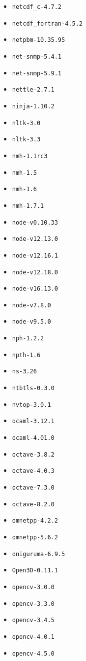 \begin{multicols}{3}
\begin{itemize}
\item \verb|netcdf_c-4.7.2|
\item \verb|netcdf_fortran-4.5.2|
\item \verb|netpbm-10.35.95|
\item \verb|net-snmp-5.4.1|
\item \verb|net-snmp-5.9.1|
\item \verb|nettle-2.7.1|
\item \verb|ninja-1.10.2|
\item \verb|nltk-3.0|
\item \verb|nltk-3.3|
\item \verb|nmh-1.1rc3|
\item \verb|nmh-1.5|
\item \verb|nmh-1.6|
\item \verb|nmh-1.7.1|
\item \verb|node-v0.10.33|
\item \verb|node-v12.13.0|
\item \verb|node-v12.16.1|
\item \verb|node-v12.18.0|
\item \verb|node-v16.13.0|
\item \verb|node-v7.8.0|
\item \verb|node-v9.5.0|
\item \verb|nph-1.2.2|
\item \verb|npth-1.6|
\item \verb|ns-3.26|
\item \verb|ntbtls-0.3.0|
\item \verb|nvtop-3.0.1|
\item \verb|ocaml-3.12.1|
\item \verb|ocaml-4.01.0|
\item \verb|octave-3.8.2|
\item \verb|octave-4.0.3|
\item \verb|octave-7.3.0|
\item \verb|octave-8.2.0|
\item \verb|omnetpp-4.2.2|
\item \verb|omnetpp-5.6.2|
\item \verb|oniguruma-6.9.5|
\item \verb|Open3D-0.11.1|
\item \verb|opencv-3.0.0|
\item \verb|opencv-3.3.0|
\item \verb|opencv-3.4.5|
\item \verb|opencv-4.0.1|
\item \verb|opencv-4.5.0|

\end{itemize}
\end{multicols}
